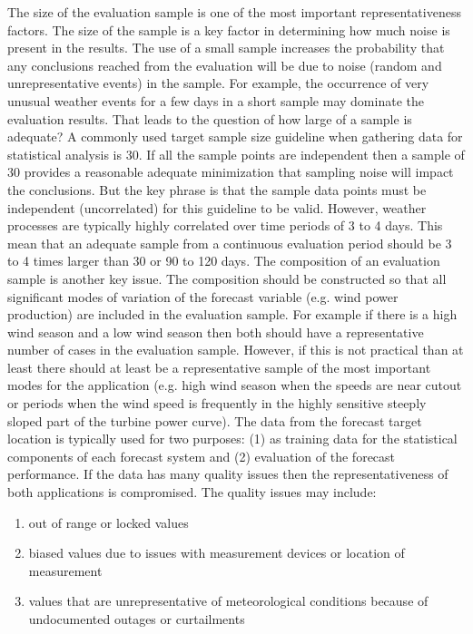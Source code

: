 The size of the evaluation sample is one of the most important representativeness factors.  The size of the sample is a key factor in determining how much noise is present in the results.  The use of a small sample increases the probability that any conclusions reached from the evaluation will be due to noise (random and unrepresentative events) in the sample.  For example, the occurrence of very unusual weather events for a few days in a short sample may dominate the evaluation results.  That leads to the question of how large of a sample is adequate?  A commonly used target sample size guideline when gathering data for statistical analysis is 30.  If all the sample points are independent then a sample of 30 provides a reasonable adequate minimization that sampling noise will impact the conclusions.  But the key phrase is that the sample data points must be independent (uncorrelated) for this guideline to be valid.  However, weather processes are typically highly correlated over time periods of 3 to 4 days. This mean that an adequate sample from a continuous evaluation period should be 3 to 4 times larger than 30 or 90 to 120 days.
The composition of an evaluation sample is another key issue.  The composition should be constructed so that all significant modes of variation of the forecast variable (e.g. wind power production) are included in the evaluation sample.  For example if there is a high wind season and a low wind season then both should have a representative number of cases in the evaluation sample.  However, if this is not practical than at least there should at least be a representative sample of the most important modes for the application (e.g. high wind season when the speeds are near cutout or periods when the wind speed is frequently in the highly sensitive steeply sloped part of the turbine power curve).
The data from the forecast target location is typically used for two purposes: (1) as training data for the statistical components of each forecast system and (2) evaluation of the forecast performance.  If the data has many quality issues then the representativeness of both applications is compromised.  
The quality issues may include: 
\begin{enumerate}
    \item out of range or locked values
    \item biased values due to issues with measurement devices or location of measurement
    \item values that are unrepresentative of meteorological conditions because of undocumented outages or curtailments
\end{enumerate}


